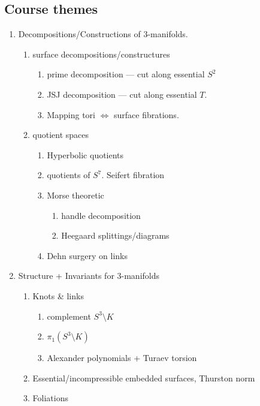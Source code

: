 \documentclass[a4paper]{article}
\begin{document}
\subsection{Course themes}

\begin{enumerate}
\item Decompositions/Constructions of 3-manifolds.
  \begin{enumerate}
  \item surface decompositions/constructures
    \begin{enumerate}
    \item prime decomposition --- cut along essential \(S^2\)
    \item JSJ decomposition --- cut along essential \(T\).
    \item Mapping tori \(\iff\) surface fibrations.
    \end{enumerate}
  \item quotient spaces
    \begin{enumerate}
    \item Hyperbolic quotients
    \item quotients of \(S^7\). Seifert fibration
    \item Morse theoretic
      \begin{enumerate}
      \item handle decomposition
      \item Heegaard splittings/diagrams
      \end{enumerate}
    \item Dehn surgery on links
    \end{enumerate}
  \end{enumerate}
\item Structure + Invariants for 3-manifolds
  \begin{enumerate}
  \item Knots \& links
    \begin{enumerate}
    \item complement \(S^3 \setminus K\)
    \item \(\pi_1(S^3 \setminus K)\)
    \item Alexander polynomials + Turaev torsion
    \end{enumerate}
  \item Essential/incompressible embedded surfaces, Thurston norm
  \item Foliations
  \end{enumerate}
\end{enumerate}
\end{document}

